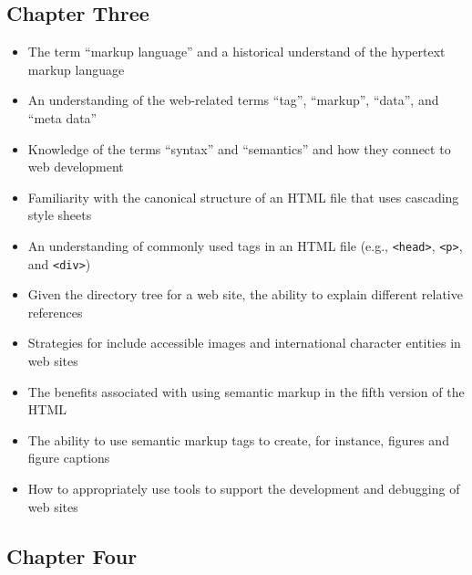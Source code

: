 \documentclass[11pt]{article}
\newcommand{\program}[1]{\lstinline{#1}}
\begin{document}
\vspace*{-.2in}
\subsection*{Chapter Three}

\begin{itemize}

  \itemsep 0in

  \item The term ``markup language'' and a historical understand of the
    hypertext markup language
  \item An understanding of the web-related terms ``tag'', ``markup'', ``data'',
    and ``meta data''
  \item Knowledge of the terms ``syntax'' and ``semantics'' and how they
    connect to web development
  \item Familiarity with the canonical structure of an HTML file that
    uses cascading style sheets
  \item An understanding of commonly used tags in an HTML file (e.g., \program{<head>},
    \program{<p>}, and \program{<div>})
  \item Given the directory tree for a web site, the ability to explain
    different relative references
  \item Strategies for include accessible images and international character
    entities in web sites
  \item The benefits associated with using semantic markup in the fifth version
    of the HTML
  \item The ability to use semantic markup tags to create, for instance, figures
    and figure captions
  \item How to appropriately use tools to support the development and
    debugging of web sites

\end{itemize}

\vspace*{-.2in}
\subsection*{Chapter Four}
\end{document}
